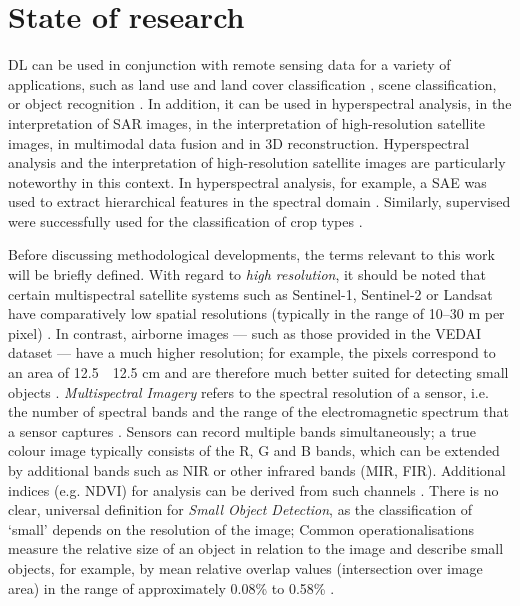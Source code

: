 \chapter{State of research}
\label{ch:state_of_research}


\acrlong{DL} can be used in conjunction with remote sensing data for a variety of applications, such as land use and land cover classification \cite{Mhanna2023}, scene classification, or object recognition \cite{Zhu2017}. In addition, it can be used in hyperspectral analysis, in the interpretation of \acrshort{SAR} images, in the interpretation of high-resolution satellite images, in multimodal data fusion and in 3D reconstruction. Hyperspectral analysis and the interpretation of high-resolution satellite images are particularly noteworthy in this context. In hyperspectral analysis, for example, a \acrfull{SAE} was used to extract hierarchical features in the spectral domain \cite{Chen2014}. Similarly, supervised  were successfully used for the classification of crop types \cite{Kussul2017}.

Before discussing methodological developments, the terms relevant to this work will be briefly defined. With regard to \emph{high resolution}, it should be noted that certain multispectral satellite systems such as Sentinel-1, Sentinel-2 or Landsat have comparatively low spatial resolutions (typically in the range of 10–30 m per pixel) \cite{Wieland2023}. In contrast, airborne images — such as those provided in the \acrshort{VEDAI} dataset — have a much higher resolution; for example, the pixels correspond to an area of 12.5~\texttimes~12.5 cm and are therefore much better suited for detecting small objects \cite{Razakarivony2015}. \emph{Multispectral Imagery} refers to the spectral resolution of a sensor, i.e. the number of spectral bands and the range of the electromagnetic spectrum that a sensor captures \cite{Khan2018}. Sensors can record multiple bands simultaneously; a true colour image typically consists of the \Acrfull{R}, \Acrfull{G} and \Acrfull{B} bands, which can be extended by additional bands such as \acrfull{NIR} or other infrared bands (\acrshort{MIR}, \acrshort{FIR}). Additional indices (e.g. \acrfull{NDVI}) for analysis can be derived from such channels \cite{Wiley2018}. There is no clear, universal definition for \emph{Small Object Detection}, as the classification of ‘small’ depends on the resolution of the image; Common operationalisations measure the relative size of an object in relation to the image and describe small objects, for example, by mean relative overlap values (intersection over image area) in the range of approximately 0.08\% to 0.58\% \cite{Chen2017}.

